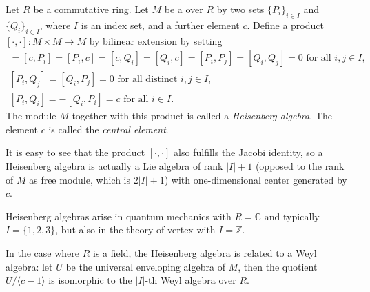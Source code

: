 \documentclass[12pt]{article}
\newcommand{\<}{\langle}
\renewcommand{\>}{\rangle}
\newcommand{\mbb}{\mathbb}
\begin{document}
Let $R$ be a commutative ring. Let $M$ be a 
over $R$  by two sets $\{P_i\}_{i\in
  I}$ and $\{Q_i\}_{i\in I}$, where
$I$ is an index set, and a further element $c$. Define a product
$[\cdot,\cdot]\colon M\times M\to M$ by bilinear extension by setting
\begin{gather*}
[c,c]=[c,P_i]=[P_i,c]=[c,Q_i]=[Q_i,c]=[P_i,P_j]=[Q_i,Q_j]=0\text{ for
all }i,j\in I,\\
[P_i,Q_j]=[Q_i,P_j]=0\text{ for all distinct }i,j\in I,\\
[P_i,Q_i]=-[Q_i,P_i]=c\text{ for all }i\in I.
\end{gather*}
The module $M$ together with this product is called a \emph{Heisenberg
algebra}. The element $c$ is called the \emph{central element}.

It is easy to see that the product $[\cdot,\cdot]$ also fulfills the
Jacobi identity, so a Heisenberg algebra is actually a Lie algebra of
rank $|I|+1$ (opposed to the rank of $M$ as free module, which is
$2|I|+1$) with one-dimensional center generated by $c$.

Heisenberg algebras arise in quantum mechanics with $R=\mbb{C}$ and
typically $I=\{1,2,3\}$, but also in the theory of vertex
 with $I=\mbb{Z}$.

In the case where $R$ is a field, the Heisenberg algebra is related to
a Weyl algebra: let $U$ be the universal enveloping algebra of
$M$, then the quotient $U/\<c-1\>$ is isomorphic to the $|I|$-th Weyl
algebra over $R$.
\end{document}

